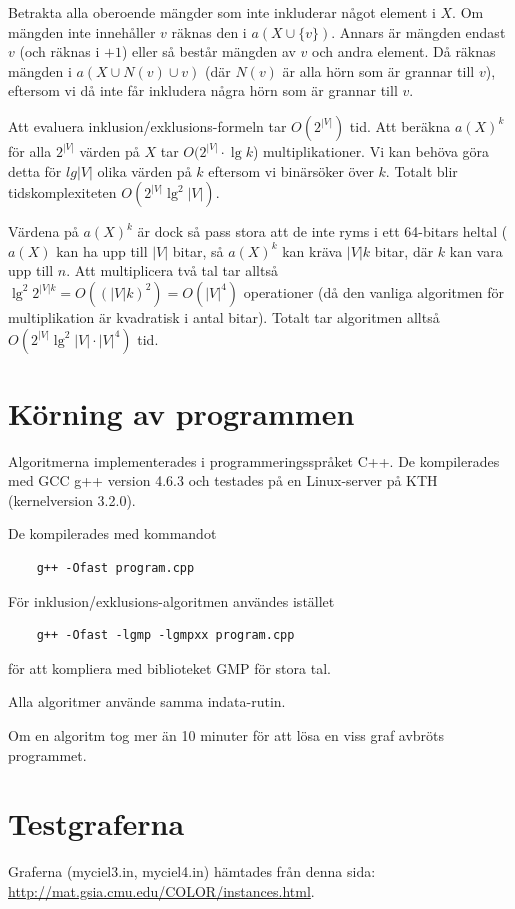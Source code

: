 \documentclass[a4paper]{report}
\begin{document}
Betrakta alla oberoende mängder som inte inkluderar något element i $X$. Om mängden inte innehåller $v$ räknas den i $a(X \cup \{v\})$. Annars är mängden endast $v$ (och räknas i $+1$)
eller så består mängden av $v$ och andra element. Då räknas mängden i $a(X \cup N(v) \cup v)$ (där $N(v)$ är alla hörn som är grannar till $v$), eftersom vi då inte får inkludera
några hörn som är grannar till $v$.

Att evaluera inklusion/exklusions-formeln tar $O(2^{|V|})$ tid. Att beräkna $a(X)^k$ för alla $2^{|V|}$  värden på $X$ tar $O(2^{|V|} \cdot \lg k$) multiplikationer. Vi kan behöva
göra detta för $lg |V|$ olika värden på $k$ eftersom vi binärsöker över $k$. Totalt blir tidskomplexiteten $O(2^{|V|} \lg^2 |V|)$.

Värdena på $a(X)^k$ är dock så pass stora att de inte ryms i ett 64-bitars heltal ($a(X)$ kan ha upp till $|V|$ bitar, så $a(X)^k$ kan kräva $|V|k$ bitar, där $k$ kan vara upp till $n$. Att multiplicera två tal tar alltså
$\lg^2 2^{|V|k} = O((|V|k)^2) = O(|V|^4)$ operationer (då den vanliga algoritmen för multiplikation är kvadratisk i antal bitar). Totalt tar algoritmen alltså $O(2^{|V|} \lg^2 |V| \cdot |V|^4)$ tid.

\chapter{Körning av programmen}
Algoritmerna implementerades i programmeringsspråket C++. De kompilerades med GCC g++ version 4.6.3 och testades på en Linux-server på KTH (kernelversion 3.2.0).

De kompilerades med kommandot
\begin{verbatim}
    g++ -Ofast program.cpp
\end{verbatim}

För inklusion/exklusions-algoritmen användes istället

\begin{verbatim}
    g++ -Ofast -lgmp -lgmpxx program.cpp
\end{verbatim}

för att kompliera med biblioteket GMP för stora tal.

Alla algoritmer använde samma indata-rutin.

Om en algoritm tog mer än 10 minuter för att lösa en viss graf avbröts programmet.

\chapter{Testgraferna}
Graferna (myciel3.in, myciel4.in) hämtades från denna sida: \url{http://mat.gsia.cmu.edu/COLOR/instances.html}.
\end{document}
